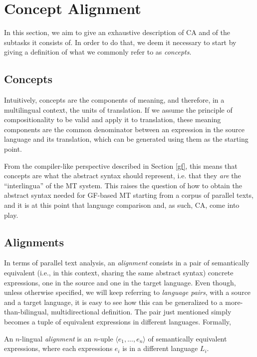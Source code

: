 \section{Concept Alignment}
In this section, we aim to give an exhaustive description of CA and of the subtasks it consists of. In order to do that, we deem it necessary to start by giving a definition of what we commonly refer to as \textit{concepts}. 

\subsection{Concepts} \label{concepts}
Intuitively, concepts are the components of meaning, and therefore, in a multilingual context, the units of translation. 
If we assume the principle of compositionality to be valid and apply it to translation, these meaning components are the common denominator between an expression in the source language and its translation, which can be generated using them as the starting point. \smallskip

From the compiler-like perspective described in Section \ref{gf}, this means that concepts are what the abstract syntax should represent, i.e. that they \textit{are} the ``interlingua'' of the MT system. 
This raises the question of how to obtain the abstract syntax needed for GF-based MT starting from a corpus of parallel texts, and it is at this point that language comparison and, as such, CA, come into play.

\subsection{Alignments} \label{aligns}
In terms of parallel text analysis, an \textit{alignment} consists in a pair of semantically equivalent (i.e., in this context, sharing the same abstract syntax) concrete expressions, one in the source and one in the target language. 
Even though, unless otherwise specified, we will keep referring to \textit{language pairs}, with a source and a target language, it is easy to see how this can be generalized to a more-than-bilingual, multidirectional definition.
The pair just mentioned simply becomes a tuple of equivalent expressions in different languages. Formally, \smallskip

\begin{definition} \label{algndef}
    An $n$-lingual \textit{alignment} is an $n$-uple $\langle e_1,...,e_n \rangle$ of semantically equivalent expressions, where each expressions $e_i$ is in a different language $L_i$.
\end{definition} \smallskip

